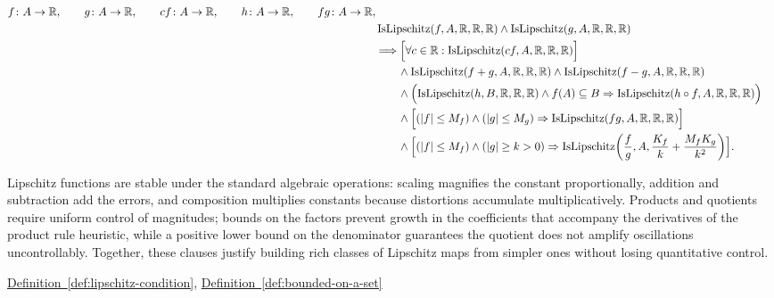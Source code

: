 \begin{remark*}
\[
\begin{aligned}
  f\colon A\to\mathbb{R},\qquad
  g\colon A\to\mathbb{R},\qquad
  cf\colon A\to\mathbb{R},\qquad
  h\colon A\to\mathbb{R},\qquad
  fg\colon A\to\mathbb{R},\\
&\operatorname{IsLipschitz}(f,A,\mathbb{R},\mathbb{R},\mathbb{R})\land \operatorname{IsLipschitz}(g,A,\mathbb{R},\mathbb{R},\mathbb{R}) \\
&\Longrightarrow \Bigl[\forall c\in\mathbb{R}:\operatorname{IsLipschitz}(cf,A,\mathbb{R},\mathbb{R},\mathbb{R})\Bigr]\\
&\qquad\land \operatorname{IsLipschitz}(f+g,A,\mathbb{R},\mathbb{R},\mathbb{R})\land \operatorname{IsLipschitz}(f-g,A,\mathbb{R},\mathbb{R},\mathbb{R})\\
&\qquad\land \Bigl(\operatorname{IsLipschitz}(h,B,\mathbb{R},\mathbb{R},\mathbb{R})\land f(A)\subseteq B\Rightarrow \operatorname{IsLipschitz}(h\circ f,A,\mathbb{R},\mathbb{R},\mathbb{R})\Bigr)\\
&\qquad\land \Bigl[(|f|\le M_f)\land(|g|\le M_g)\Rightarrow \operatorname{IsLipschitz}(fg,A,\mathbb{R},\mathbb{R},\mathbb{R})\Bigr]\\
&\qquad\land \Bigl[(|f|\le M_f)\land(|g|\ge k>0)\Rightarrow \operatorname{IsLipschitz}\!\left(\frac{f}{g},A,\frac{K_f}{k}+\frac{M_fK_g}{k^2}\right)\Bigr].
\end{aligned}
\]
\end{remark*}

\begin{remark*}[Interpretation]
Lipschitz functions are stable under the standard algebraic operations: scaling magnifies the constant proportionally, addition and subtraction add the errors, and composition multiplies constants because distortions accumulate multiplicatively. Products and quotients require uniform control of magnitudes; bounds on the factors prevent growth in the coefficients that accompany the derivatives of the product rule heuristic, while a positive lower bound on the denominator guarantees the quotient does not amplify oscillations uncontrollably. Together, these clauses justify building rich classes of Lipschitz maps from simpler ones without losing quantitative control.
\end{remark*}

\begin{dependencies}
\hyperref[def:lipschitz-condition]{Definition~\ref{def:lipschitz-condition}}, \hyperref[def:bounded-on-a-set]{Definition~\ref{def:bounded-on-a-set}}
\end{dependencies}

